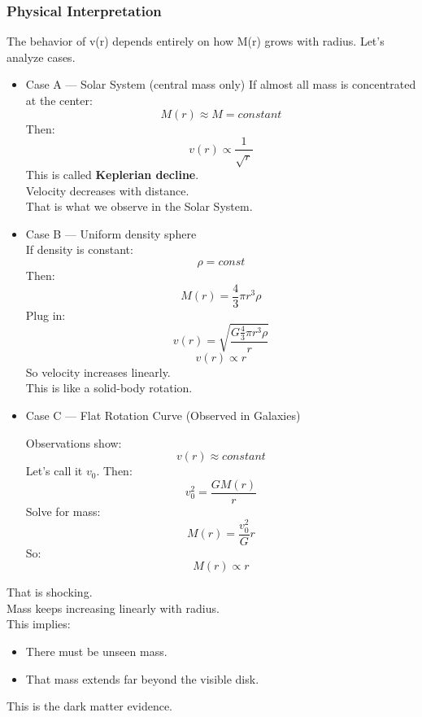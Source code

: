 \documentclass[14pt,a4paper]{article}
\begin{document}
\subsubsection{Physical Interpretation}
The behavior of v(r) depends entirely on how M(r) grows with radius.
Let’s analyze cases.
\begin{itemize}
\item Case A — Solar System (central mass only)
If almost all mass is concentrated at the center:
\[M(r) \approx M = constant\]
Then:
\[v(r)\propto\frac{1}{\sqrt{r}}\]
This is called \textbf{Keplerian decline}.\\
Velocity decreases with distance.\\
That is what we observe in the Solar System.\\
\item Case B — Uniform density sphere\\
If density is constant:
\[ \rho = const \]
Then:
\[M(r)=\frac{4}{3}\pi r^3 \rho \]
Plug in:
\[v(r)=\sqrt{\frac{G\frac{4}{3}\pi r^3 \rho}{r}}\]
\[v(r)\propto r\]
So velocity increases linearly.\\
This is like a solid-body rotation.\\
\item Case C — Flat Rotation Curve (Observed in Galaxies)

Observations show:\\
\[v(r) \approx constant\]
Let’s call it \(v_0\).
Then:
\[v_0^2=\frac{GM(r)}{r}\]
Solve for mass:
\[M(r)=\frac{v_0^2}{G}r\]
So:
\[ \boxed{M(r)\propto r} \]
\end{itemize}
That is shocking.\\
Mass keeps increasing linearly with radius.\\
This implies:
\begin{itemize}
\item There must be unseen mass.
\item That mass extends far beyond the visible disk.
\end{itemize}
This is the dark matter evidence.
\end{document}
